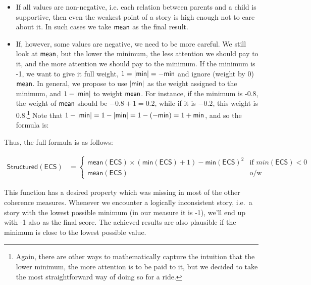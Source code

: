 \documentclass[10pt,]{scrartcl}
\newcommand{\s}[1]{\mbox{\textsf{#1}}}
\begin{document}
\begin{itemize}
\item  If all values are non-negative, i.e. each relation between parents and a child is supportive, then even the weakest point of a story is high enough not to care about it. In such cases we take $\s{mean}$ as the final result.

\item If, however, some values are negative, we need to be more careful. We still look at  $\s{mean}$, but  the lower the minimum, the less attention we should pay to it, and the more attention we should pay to the minimum. If the minimum is -1, we want to give it full weight, $1 = \vert \s{min}\vert = - \s{min}$ and ignore (weight by 0) $\s{mean}$. In general, we propose to use $\vert \s{min}\vert$  as the weight assigned to the minimum, and  $1-\vert \s{min}\vert$  to weight $\s{mean}$.  For instance, if the minimum is -0.8, the weight of  $\s{mean}$ should be $-0.8+1 = 0.2$, while if it is $-0.2$, this weight is $0.8$.\footnote{Again, there are other ways to mathematically capture the intuition that the lower minimum, the more attention is to be paid to it, but we decided to take the most straightforward way of doing so for a ride.}  Note that  $1-\vert \s{min}\vert =  1-\vert \s{min}\vert = 1 - (- \s{min}) = 1+\s{min}$, and so the  formula is:
\end{itemize}

Thus, the full formula is as follows:

\footnotesize

\begin{align*}
\mathsf{Structured}(\mathsf{ECS}) & = \begin{cases}
\mathsf{mean}(\mathsf{ECS})  \times \left(\textsf{min}(\mathsf{ECS})+1 \right) - \textsf{min}(\mathsf{ECS})^2   & \text{if } min(\mathsf{ECS})<0 \\\mathsf{mean}(\mathsf{ECS}) & \text{o/w}
\end{cases}
\end{align*}

\normalsize





This function has a desired property which was missing in most of the
other coherence measures. Whenever we encounter a logically inconsistent
story, i.e.~a story with the lowest possible minimum (in our measure it
is -1), we'll end up with -1 also as the final score. The achieved
results are also plausible if the minimum is close to the lowest
possible value.
\end{document}
